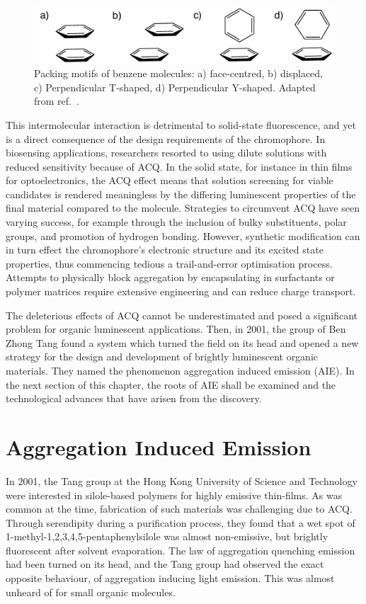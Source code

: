 \begin{figure}[H]
\centering
  \includegraphics[width=0.7\linewidth]{Intro/Stacking.pdf}
  \caption[Benzene Stacking Motifs]{Packing motifs of benzene molecules: a) face-centred, b) displaced, c) Perpendicular T-shaped, d) Perpendicular Y-shaped. Adapted from ref.~.}
  \label{figure: Benzene_Stacking}
\end{figure}


This intermolecular interaction is detrimental to solid-state fluorescence, and yet is a direct consequence of the design requirements of the chromophore. In biosensing applications, researchers resorted to using dilute solutions with reduced sensitivity because of ACQ.\cite{Thomas2007,Kwok2015} In the solid state, for instance in thin films for optoelectronics, the ACQ effect means that solution screening for viable candidates is rendered meaningless by the differing luminescent properties of the final material compared to the molecule. Strategies to circumvent ACQ have seen varying success, for example through the inclusion of bulky substituents, polar groups, and promotion of hydrogen bonding.\cite{Hong2009,Zhang2013,Mei2014,Mei2015} However, synthetic modification can in turn effect the chromophore's electronic structure and its excited state properties, thus commencing tedious a trail-and-error optimisation process. Attempts to physically block aggregation by encapsulating in surfactants or polymer matrices require extensive engineering and can reduce charge transport.\cite{Hong2009,Chen2000,Lee2013} 

The deleterious effects of ACQ cannot be underestimated and posed a significant problem for organic luminescent applications. Then, in 2001, the group of Ben Zhong Tang found a system which turned the field on its head and opened a new strategy for the design and development of brightly luminescent organic materials. They named the phenomenon aggregation induced emission (AIE). In the next section of this chapter, the roots of AIE shall be examined and the technological advances that have arisen from the discovery.
\section{Aggregation Induced Emission}\label{section: lom AIE}
In 2001, the Tang group at the Hong Kong University of Science and Technology were interested in silole-based polymers for highly emissive thin-films. As was common at the time, fabrication of such materials was challenging due to ACQ. Through serendipity during a purification process, they found that a wet spot of 1-methyl-1,2,3,4,5-pentaphenylsilole was almost non-emissive, but brightly fluorescent after solvent evaporation.\cite{Luo2001} The law of aggregation quenching emission had been turned on its head, and the Tang group had observed the exact opposite behaviour, of aggregation inducing light emission. This was almost unheard of for small organic molecules. 

